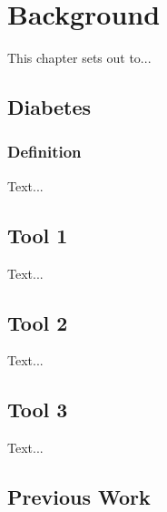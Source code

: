 \chapter{Background}

This chapter sets out to...

\section{Diabetes}

\subsection{Definition}

Text...

\section{Tool 1}
Text...

\section{Tool 2}
Text...

\section{Tool 3}
Text...

\section{Previous Work}
